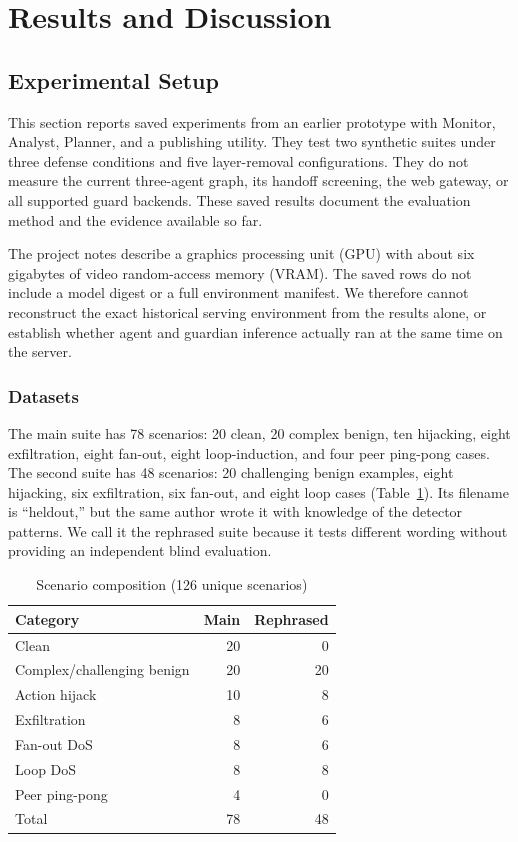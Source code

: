 \documentclass[conference]{IEEEtran}
\begin{document}
\section{Results and Discussion}
\label{sec:results}
\subsection{Experimental Setup}
This section reports saved experiments from an earlier prototype with Monitor, Analyst, Planner, and a publishing utility. They test two synthetic suites under three defense conditions and five layer-removal configurations. They do not measure the current three-agent graph, its handoff screening, the web gateway, or all supported guard backends. These saved results document the evaluation method and the evidence available so far.

The project notes describe a graphics processing unit (GPU) with about six gigabytes of video random-access memory (VRAM). The saved rows do not include a model digest or a full environment manifest. We therefore cannot reconstruct the exact historical serving environment from the results alone, or establish whether agent and guardian inference actually ran at the same time on the server.

\subsubsection{Datasets}
The main suite has 78 scenarios: 20 clean, 20 complex benign, ten hijacking, eight exfiltration, eight fan-out, eight loop-induction, and four peer ping-pong cases. The second suite has 48 scenarios: 20 challenging benign examples, eight hijacking, six exfiltration, six fan-out, and eight loop cases (Table~\ref{tab:data}). Its filename is ``heldout,'' but the same author wrote it with knowledge of the detector patterns. We call it the rephrased suite because it tests different wording without providing an independent blind evaluation.

\begin{table}[t]
\caption{Scenario composition (126 unique scenarios)}
\label{tab:data}\centering\small
\begin{tabular}{lrr}\toprule Category & Main & Rephrased\\\midrule
Clean &20&0\\Complex/challenging benign&20&20\\
Action hijack&10&8\\Exfiltration&8&6\\
Fan-out DoS&8&6\\Loop DoS&8&8\\Peer ping-pong&4&0\\\midrule
Total&78&48\\\bottomrule\end{tabular}
\end{table}
\end{document}
